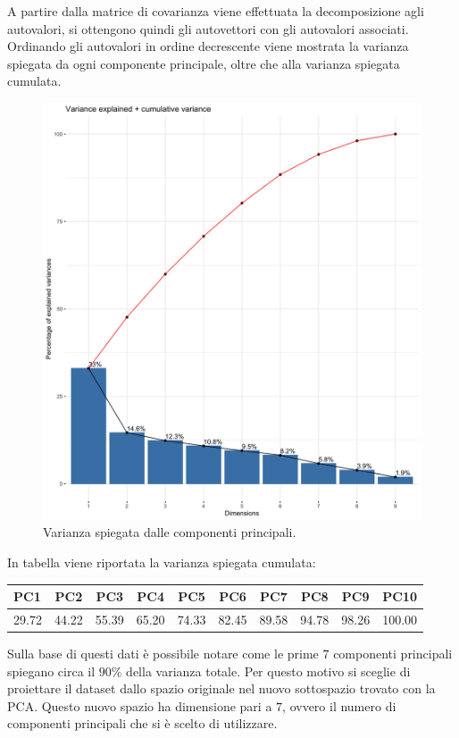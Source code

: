 A partire dalla matrice di covarianza viene effettuata la
decomposizione agli autovalori, si ottengono quindi gli autovettori
con gli autovalori associati. Ordinando gli autovalori in ordine
decrescente viene mostrata la varianza spiegata da ogni componente
principale, oltre che alla varianza spiegata cumulata.

\begin{figure}[H]
	\centering
	\includegraphics[width=13cm]{../images/pca_variance_explained.png}
	\caption{Varianza spiegata dalle componenti principali.}
\end{figure}

In tabella viene riportata la varianza spiegata cumulata:


	\begin{tabular}{|l c c c c c c c c c|} 
		\hline
		PC1 & PC2 & PC3 & PC4 & PC5 & PC6 & PC7 & PC8 & PC9 & PC10\\
		\hline
		29.72 &
		44.22 &
		55.39 &
		65.20 &
		74.33 &
		82.45 &
		89.58 &
		94.78 &
		98.26 &
		100.00 \\
		\hline
		
	\end{tabular}

Sulla base di questi dati è possibile notare come le prime $7$
componenti principali spiegano circa il $90\%$ della varianza
totale. Per questo motivo si sceglie di proiettare il dataset dallo
spazio originale nel nuovo sottospazio trovato con la PCA. Questo
nuovo spazio ha dimensione pari a $7$, ovvero il numero di componenti
principali che si è scelto di utilizzare.

